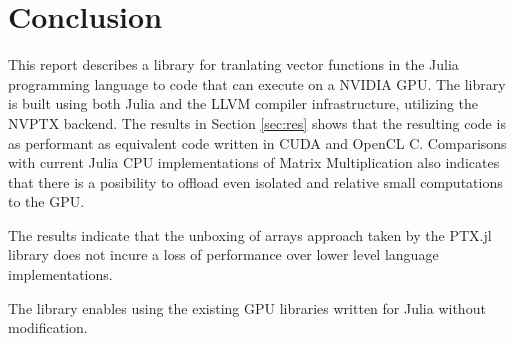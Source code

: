 \chapter{Conclusion}
\begin{markdown}

This report describes a library for tranlating vector functions in the
Julia programming language to code that can execute on a NVIDIA
GPU. The library is built using both Julia and the LLVM compiler
infrastructure, utilizing the NVPTX backend. The results in Section
\ref{sec:res} shows that the resulting code is as performant as
equivalent code written in CUDA and OpenCL C. Comparisons with current
Julia CPU implementations of Matrix Multiplication also indicates that
there is a posibility to offload even isolated and relative small
computations to the GPU.

The results indicate that the unboxing of arrays approach taken by the
PTX.jl library does not incure a loss of performance over lower level
language implementations.

The library enables using the existing GPU libraries written for Julia
without modification.

\end{markdown}
